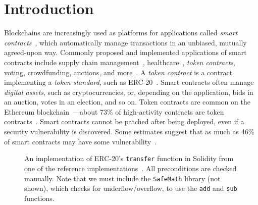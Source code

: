\documentclass[nonacm, dvipsnames, sigconf]{acmart}
\begin{document}

\maketitle

\section{Introduction}
Blockchains are increasingly used as platforms for applications called \emph{smart contracts}~\cite{Szabo97:Formalizing}, which automatically manage transactions in an unbiased, mutually agreed-upon way.
Commonly proposed and implemented applications of smart contracts include supply chain management~\cite{SupplyChainUse}, healthcare~\cite{HealthcareUse}, \emph{token contracts}, voting, crowdfunding, auctions, and more~\cite{Elsden18:Making}.
A \emph{token contract} is a contract implementing a \emph{token standard}, such as ERC-20~\cite{erc20}.
Smart contracts often manage \emph{digital assets}, such as cryptocurrencies, or, depending on the application, bids in an auction, votes in an election, and so on.
Token contracts are common on the Ethereum blockchain~\cite{wood2014ethereum}---about 73\% of high-activity contracts are token contracts~\cite{OlivaEtAl2019}.
Smart contracts cannot be patched after being deployed, even if a security vulnerability is discovered.
Some estimates suggest that as much as 46\% of smart contracts may have some vulnerability~\cite{luuOyente}.
\begin{figure}[!b]
    \centering
    
    \caption{An implementation of ERC-20's \lstinline{transfer} function in Solidity from one of the reference implementations~\cite{erc20Consensys}.
        All preconditions are checked manually.
        Note that we must include the \lstinline{SafeMath} library (not shown), which checks for underflow/overflow, to use the \lstinline{add} and \lstinline{sub} functions.}
    \label{fig:erc20-transfer-sol}
\end{figure}
\end{document}
